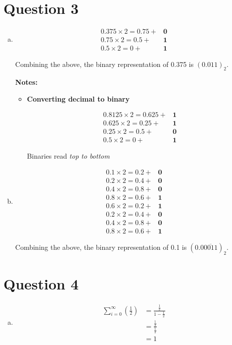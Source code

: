\documentclass[12pt]{article}
\begin{document}
\section*{Question 3}
\begin{enumerate}[a.]
    \item
    \setcounter{equation}{0}
    \begin{align}
        0.375 \times 2 = 0.75 + &\textbf{0}\\
        0.75 \times 2 = 0.5 + &\textbf{1}\\
        0.5 \times 2 = 0 + &\textbf{1}
    \end{align}

    Combining the above, the binary representation of 0.375 is $(0.011)_2$.

    \textbf{Notes:}
    \begin{itemize}
        \item \textbf{Converting decimal to binary}

        \begin{align}
            0.8125 \times 2 = 0.625 + &\textbf{1}\\
            0.625 \times 2 = 0.25 + &\textbf{1}\\
            0.25 \times 2 = 0.5 + &\textbf{0}\\
            0.5 \times 2 = 0 + &\textbf{1}
        \end{align}

        Binaries read \textit{top to bottom}
    \end{itemize}

    \item

    \setcounter{equation}{0}
    \begin{align}
        0.1 \times 2 = 0.2 + &\textbf{0}\\
        0.2 \times 2 = 0.4 + &\textbf{0}\\
        0.4 \times 2 = 0.8 + &\textbf{0}\\
        0.8 \times 2 = 0.6 + &\textbf{1}\\
        0.6 \times 2 = 0.2 + &\textbf{1}\\
        0.2 \times 2 = 0.4 + &\textbf{0}\\
        0.4 \times 2 = 0.8 + &\textbf{0}\\
        0.8 \times 2 = 0.6 + &\textbf{1}
    \end{align}

    Combining the above, the binary representation of 0.1 is $(0.0\overline{0011})_2$.

\end{enumerate}

\section*{Question 4}
\begin{enumerate}[a.]
    \item
    \setcounter{equation}{0}
    \begin{align}
        \sum\limits_{i=0}^{\infty} \left(\frac{1}{2}\right) &= \frac{\frac{1}{2}}{1 - \frac{1}{2}}\\
        &= \frac{\frac{1}{2}}{\frac{1}{2}}\\
        &= 1
    \end{align}
\end{enumerate}
\end{document}
